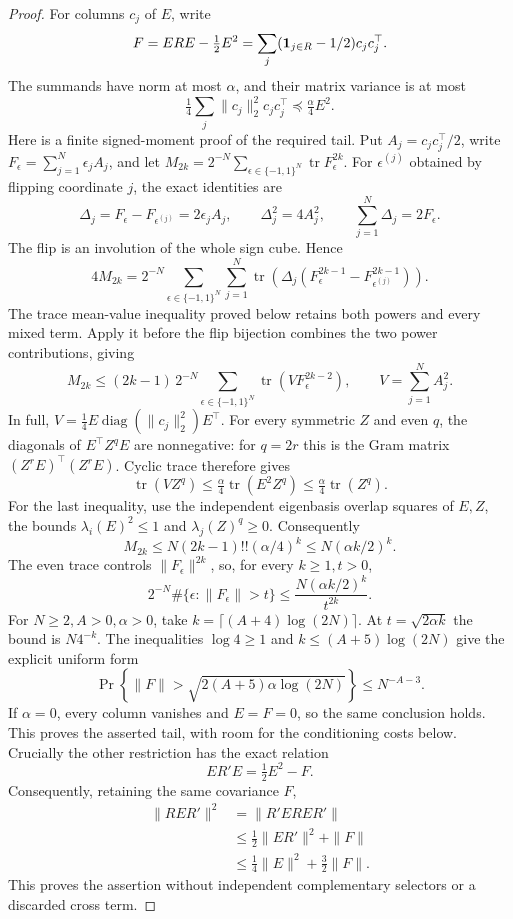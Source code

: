 \begin{proof}
For columns \(c_j\) of \(E\), write
\[
 F=ERE-\tfrac12 E^2
       =\sum_j(\mathbf1_{j\in R}-1/2)c_jc_j^\top .
\]
The summands have norm at most \(\alpha\), and their matrix
variance is at most
\[
 \tfrac14\sum_j\|c_j\|_2^2c_jc_j^\top
              \preceq\tfrac{\alpha}{4}E^2 .
\]
Here is a finite signed-moment proof of the required tail.
Put \(A_j=c_jc_j^\top/2\), write
\(F_\epsilon=\sum_{j=1}^N\epsilon_jA_j\), and let
\(M_{2k}=2^{-N}\sum_{\epsilon\in\{-1,1\}^N}
                   \operatorname{tr}F_\epsilon^{2k}\).
For \(\epsilon^{(j)}\) obtained by flipping coordinate \(j\),
the exact identities are
\[
 \Delta_j=F_\epsilon-F_{\epsilon^{(j)}}=2\epsilon_jA_j,
 \qquad \Delta_j^2=4A_j^2,\qquad \sum_{j=1}^N\Delta_j=2F_\epsilon .
\]
The flip is an involution of the whole sign cube. Hence
\[
 4M_{2k}=2^{-N}\sum_{\epsilon\in\{-1,1\}^N}\sum_{j=1}^N
 \operatorname{tr}\!\left(
 \Delta_j(F_\epsilon^{2k-1}-F_{\epsilon^{(j)}}^{2k-1})\right).
\]
The trace mean-value inequality proved below retains both
powers and every mixed term. Apply it before the flip
bijection combines the two power contributions, giving
\[
 M_{2k}\leq(2k-1)\,2^{-N}\sum_{\epsilon\in\{-1,1\}^N}
                 \operatorname{tr}(V F_\epsilon^{2k-2}),
 \qquad V=\sum_{j=1}^NA_j^2 .
\]
In full, \(V=\tfrac14E\operatorname{diag}
(\|c_j\|_2^2)E^\top\). For every symmetric \(Z\) and
even \(q\), the diagonals of \(E^\top Z^qE\) are
nonnegative: for \(q=2r\) this is the Gram matrix
\((Z^rE)^\top(Z^rE)\).
Cyclic trace therefore gives
\[
 \operatorname{tr}(VZ^q)
 \leq\tfrac{\alpha}{4}\operatorname{tr}(E^2Z^q)
 \leq\tfrac{\alpha}{4}\operatorname{tr}(Z^q).
\]
For the last inequality, use the independent eigenbasis
overlap squares of \(E,Z\), the bounds
\(\lambda_i(E)^2\leq1\) and \(\lambda_j(Z)^q\geq0\).
Consequently
\[
 M_{2k}\leq N(2k-1)!!(\alpha/4)^k
          \leq N(\alpha k/2)^k .
\]
The even trace controls \(\|F_\epsilon\|^{2k}\), so, for
every \(k\geq1,t>0\),
\[
 2^{-N}\#\{\epsilon:\|F_\epsilon\|>t\}
          \leq\frac{N(\alpha k/2)^k}{t^{2k}}.
\]
For \(N\geq2,A>0,\alpha>0\), take
\(k=\lceil(A+4)\log(2N)\rceil\).
At \(t=\sqrt{2\alpha k}\) the bound is \(N4^{-k}\).
The inequalities \(\log4\geq1\) and
\(k\leq(A+5)\log(2N)\) give the explicit uniform form
\[
 \Pr\!\left\{\|F\|>
       \sqrt{2(A+5)\alpha\log(2N)}\right\}
             \leq N^{-A-3}.
\]
If \(\alpha=0\), every column vanishes and \(E=F=0\),
so the same conclusion holds. This proves the asserted
tail, with room for the conditioning costs below.
Crucially the other restriction has the exact relation
\[
 ER'E=\tfrac12 E^2-F .
\]
Consequently, retaining the same covariance \(F\),
\[
 \begin{split}
 \|RER'\|^2
 &=\|R'ERER'\|\\
 &\leq\tfrac12\|ER'\|^2+\|F\|\\
 &\leq\tfrac14\|E\|^2+\tfrac32\|F\|.
 \end{split}
\]
This proves the assertion without independent complementary
selectors or a discarded cross term.


\end{proof}

